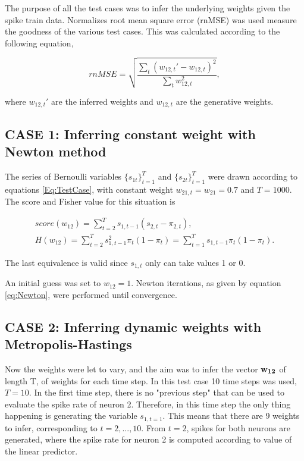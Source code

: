 The purpose of all the test cases was to infer the underlying weights given the spike train data. Normalizes root mean square error (rnMSE) was used measure the goodness of the various test cases. This was calculated according to the following equation,

\begin{equation}
    rnMSE = \sqrt{\frac{\sum_t(w_{12,t}'-w_{12,t})^2}{\sum_t w_{12,t}^2}},
\end{equation}

where $w_{12,t}'$  are the inferred weights and $w_{12,t}$ are the generative weights.

\subsection{CASE 1: Inferring constant weight with Newton method}

The series of Bernoulli variables $\{s_{1t}\}_{t=1}^T$ and $\{s_{2t}\}_{t=1}^T$ were drawn according to equations \ref{Eq:TestCase}, with constant weight $w_{21,t} = w_{21} = 0.7$ and $T=1000$. The score and Fisher value for this situation is 

\begin{equation}
\begin{split}
    score(w_{12}) = \sum_{t=2}^{T} s_{1, t-1} (s_{2,t}-\pi_{2,t}), \\
    H(w_{12}) = \sum_{t=2}^T s_{1, t-1}^2 \pi_t(1-\pi_t) = \sum_{t=1}^T s_{1, t-1} \pi_t(1-\pi_t).
\end{split}
\end{equation}

The last equivalence is valid since $s_{1,t}$ only can take values 1 or 0. 

An initial guess was set to $w_{12} = 1$. Newton iterations, as given by equation \ref{eq:Newton}, were performed until convergence.\\ 

\subsection{CASE 2: Inferring dynamic weights with Metropolis-Hastings}
Now the weights were let to vary, and the aim was to infer the vector ${\bf w_{12}}$ of length T, of weights for each time step. In this test case 10 time steps was used, $T=10$. In the first time step, there is no "previous step" that can be used to evaluate the spike rate of neuron 2. Therefore, in this time step the only thing happening is generating the variable $s_{1,t=1}$. This means that there are 9 weights to infer, corresponding to $t=2,...,10$. From $t=2$, spikes for both neurons are generated, where the spike rate for neuron 2 is computed according to value of the linear predictor. 

